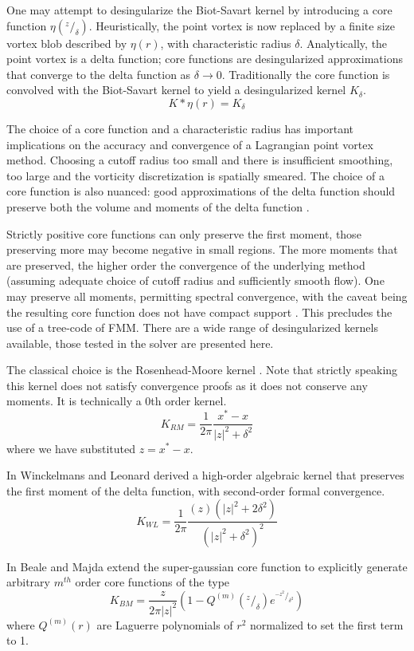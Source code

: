 \documentclass[letterpaper,12pt]{report}
\newcommand{\ben}[1]{\begin{equation}\label{#1}}
\newcommand{\ee}{\end{equation}}
\begin{document}
One may attempt to desingularize the Biot-Savart kernel  by introducing a core function $\eta(^z/_{\delta})$. Heuristically, the point vortex is now replaced by a finite size vortex blob described by $\eta(r)$, with characteristic radius $\delta$. Analytically, the point vortex is a delta function; core functions are desingularized approximations that converge to the delta function as $\delta \rightarrow 0$. Traditionally the core function is convolved with the Biot-Savart kernel to yield a desingularized kernel $K_{\delta}$.
\ben{DesingBS} K*\eta(r) = K_{\delta} \ee

The choice of a core function and a characteristic radius has important implications on the accuracy and convergence of a Lagrangian point vortex method. Choosing a cutoff radius too small and there is insufficient smoothing, too large and the vorticity discretization is spatially smeared. The choice of a core function is also nuanced: good approximations of the delta function should preserve both the volume and moments of the delta function \cite{BealeMajda}.

Strictly positive core functions can only preserve the first moment, those preserving more may become negative in small regions. The more moments that are preserved, the higher order the convergence of the underlying method (assuming adequate choice of cutoff radius and sufficiently smooth flow). One may preserve all moments, permitting spectral convergence, with the caveat being the resulting core function does not have compact support \cite{Hald3}. This precludes the use of a tree-code of FMM. There are a wide range of desingularized kernels available, those tested in the solver are presented here.

The classical choice is the Rosenhead-Moore kernel \cite{Rosenhead1930,Moore1972}. Note that strictly speaking this kernel does not satisfy convergence proofs as it does not conserve any moments. It is technically a 0th order kernel.
\ben{RMkern} K_{RM} = \frac{1}{2 \pi} \frac{x^*-x}{|z|^2+\delta^2} \ee
where we have substituted $z=x^*-x$.

In \cite{WL} Winckelmans and Leonard derived a high-order algebraic kernel that preserves the first moment of the delta function, with second-order formal convergence.
\ben{WLkern} K_{WL}=\frac{1}{2 \pi} \frac{(z)(|z|^2+2\delta^2)}{(|z|^2+\delta^2)^2} \ee

In \cite{BealeMajda} Beale and Majda extend the super-gaussian core function to explicitly generate arbitrary $m^{th}$ order core functions of the type
\ben{SGkern} K_{BM}= \frac{z}{2 \pi |z|^2} (1-Q^{(m)}(^z\!/_{\delta})e^{^{-z^2}\!/_{\delta^2}} )\ee
where $Q^{(m)}(r)$ are Laguerre polynomials of $r^2$ normalized to set the first term to 1.
\end{document}
